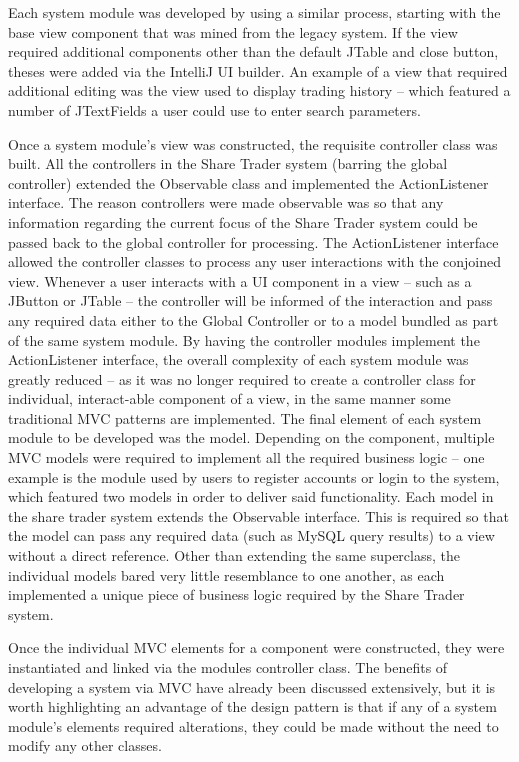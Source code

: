 \documentclass[12pt, a4paper,titlepage]{article}
\begin{document}
Each system module was developed by using a similar process, starting with the
base view component that was mined from the legacy system. If the view
required additional components other than the default JTable and close button,
theses were added via the IntelliJ UI builder. An example of a view that
required additional editing was the view used to display trading history –
which featured a number of JTextFields a user could use to enter search
parameters.

Once a system module’s view was constructed, the requisite controller class
was built. All the controllers in the Share Trader system (barring the global
controller) extended the Observable class and implemented the ActionListener
interface. The reason controllers were made observable was so that any
information regarding the current focus of the Share Trader system could be
passed back to the global controller for processing.  The ActionListener
interface allowed the controller classes to process any user interactions with
the conjoined view. Whenever a user interacts with a UI component in a view –
such as a JButton or JTable – the controller will be informed of the
interaction and pass any required data either to the Global Controller or to a
model bundled as part of the same system module.
By having the controller modules implement the ActionListener interface, the
overall complexity of each system module was greatly reduced – as it was no
longer required to create a controller class for individual, interact-able
component of a view, in the same manner some traditional MVC patterns are
implemented.  The final element of each system module to be developed was the
model. Depending on the component, multiple MVC models were required to
implement all the required business logic – one example is the module used by
users to register accounts or login to the system, which featured two models
in order to deliver said functionality.
Each model in the share trader system extends the Observable interface. This
is required so that the model can pass any required data (such as MySQL query
results) to a view without a direct reference.  Other than extending the same
superclass, the individual models bared very little resemblance to one
another, as each implemented a unique piece of business logic required by the
Share Trader system.

Once the individual MVC elements for a component were constructed, they were
instantiated and linked via the modules controller class. The benefits of
developing a system via MVC have already been discussed extensively, but it is
worth highlighting an advantage of the design pattern is that if any of a
system module’s elements  required alterations, they could be made without the
need to modify any other classes.
\end{document}
